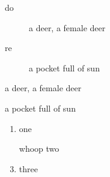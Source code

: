 \documentclass{article}
\begin{document}
\def\descriptionlabel#1{\em$\lbrace$#1$\rbrace$\space}
\begin{description}
\item[do] a deer, a female deer
\item[re] a pocket full of sun
\end{description}


\begin{description}
\item a deer, a female deer
\item a pocket full of sun
\end{description}

\begin{enumerate}[\bf -a-]
\item one
\item[whoop] two
\item three
\end{enumerate}
\end{document}
